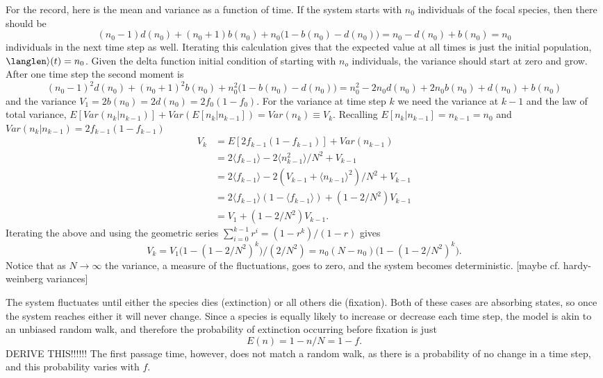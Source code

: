 For the record, here is the mean and variance as a function of time.
If the system starts with $n_0$ individuals of the focal species, then there should be
\begin{equation*}
(n_0-1)d(n_0) + (n_0+1)b(n_0) + n_0\big(1-b(n_0)-d(n_0)\big) = n_0 - d(n_0) + b(n_0) = n_0
\end{equation*}
individuals in the next time step as well.
Iterating this calculation gives that the expected value at all times is just the initial population, $\langlen\rangle(t) = n_0$.
Given the delta function initial condition of starting with $n_o$ individuals, the variance should start at zero and grow.
After one time step the second moment is
\begin{equation*}
(n_0-1)^2d(n_0) + (n_0+1)^2b(n_0) + n_0^2\big(1-b(n_0)-d(n_0)\big) = n_0^2 - 2n_0d(n_0) + 2n_0b(n_0) + d(n_0) + b(n_0)
\end{equation*}
and the variance $V_1 = 2b(n_0) = 2d(n_0) = 2f_0(1-f_0)$.
For the variance at time step $k$ we need the variance at $k-1$ and the law of total variance, $E[Var(n_k|n_{k-1})]+Var(E[n_k|n_{k-1}])=Var(n_k)\equiv V_k$.
Recalling $E[n_k|n_{k-1}]=n_{k-1}=n_0$ and $Var(n_k|n_{k-1})=2f_{k-1}(1-f_{k-1})$
\begin{align*}
V_k &= E\left[ 2 f_{k-1}(1-f_{k-1}) \right] + Var(n_{k-1}) \\
    &= 2\langle f_{k-1}\rangle - 2\langle n_{k-1}^2\rangle/N^2 + V_{k-1} \\
    &= 2\langle f_{k-1}\rangle - 2(V_{k-1}+\langle n_{k-1}\rangle^2)/N^2 + V_{k-1} \\
    &= 2\langle f_{k-1}\rangle (1 - \langle f_{k-1}\rangle ) + (1-2/N^2)V_{k-1} \\
    &= V_1 + (1-2/N^2)V_{k-1}.
\end{align*}
Iterating the above and using the geometric series $\sum_{i=0}^{k-1} r^i = (1-r^k)/(1-r)$ gives
\begin{equation*}
V_k = V_1 \big(1-(1-2/N^2)^k\big)/(2/N^2) = n_0(N-n_0) \big(1-(1-2/N^2)^k\big).
\end{equation*}
Notice that as $N\rightarrow\infty$ the variance, a measure of the fluctuations, goes to zero, and the system becomes deterministic. [maybe cf. hardy-weinberg variances]

The system fluctuates until either the species dies (extinction) or all others die (fixation).
Both of these cases are absorbing states, so once the system reaches either it will never change.
Since a species is equally likely to increase or decrease each time step, the model is akin to an unbiased random walk, and therefore the probability of extinction occurring before fixation is just
\begin{equation}
E(n) = 1-n/N = 1-f.
\end{equation}
DERIVE THIS!!!!!!
The first passage time, however, does not match a random walk, as there is a probability of no change in a time step, and this probability varies with $f$.

